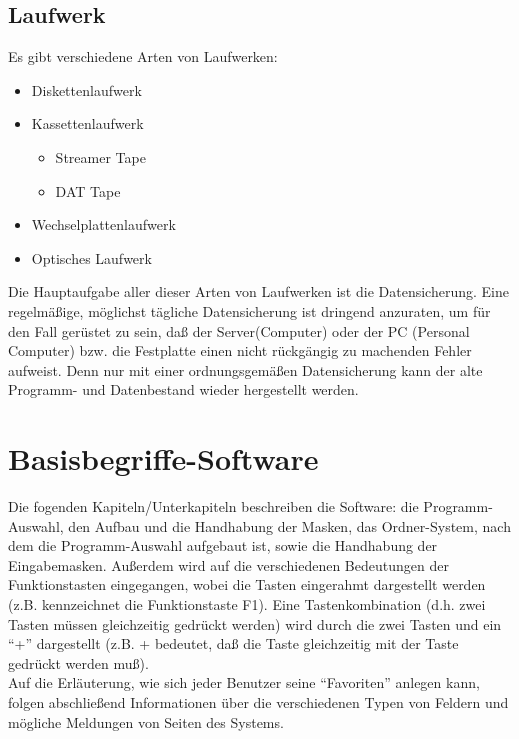 \section{Laufwerk}   

Es gibt verschiedene Arten von Laufwerken:

\begin{itemize}
\item Diskettenlaufwerk
\item Kassettenlaufwerk
\begin{itemize}
\item Streamer Tape
\item DAT Tape
\end{itemize}
\item Wechselplattenlaufwerk
\item Optisches Laufwerk
\end{itemize}

Die Hauptaufgabe aller dieser Arten von Laufwerken ist die Datensicherung.
Eine regelm\"{a}{\ss}ige, m\"{o}glichst t\"{a}gliche Datensicherung ist
dringend anzuraten, um f\"{u}r den Fall ger\"{u}stet zu sein, da{\ss} der
Server(Computer) oder der PC (Personal Computer) bzw. die Festplatte einen
nicht r\"{u}ckg\"{a}ngig zu machenden Fehler aufweist. Denn nur mit einer
ordnungsgem\"{a}{\ss}en Datensicherung kann der alte Programm- und Datenbestand
wieder hergestellt werden.

\cleardoublepage

\chapter{Basisbegriffe-Software}

Die fogenden Kapiteln/Unterkapiteln beschreiben die Software: die Programm-Auswahl, den
Aufbau und die Handhabung der Masken, das Ordner-System, nach dem die
Programm-Auswahl aufgebaut ist, sowie die Handhabung
der Eingabemasken. Au{\ss}erdem wird auf die verschiedenen Bedeutungen
der Funktionstasten eingegangen, wobei die Tasten eingerahmt
dargestellt werden (z.B. kennzeichnet  die Funktionstaste F1).
Eine Tastenkombination (d.h. zwei Tasten m\"{u}ssen gleichzeitig
gedr\"{u}ckt werden) wird durch die zwei Tasten und ein ``+'' dargestellt (z.B. + bedeutet, da{\ss} die
Taste  gleichzeitig mit der Taste 
gedr\"{u}ckt werden mu{\ss}).\\
Auf die Erl\"{a}uterung, wie sich jeder Benutzer seine ``Favoriten'' anlegen
kann, folgen abschlie{\ss}end Informationen \"{u}ber die verschiedenen Typen
von Feldern und m\"{o}gliche Meldungen von Seiten des Systems.

